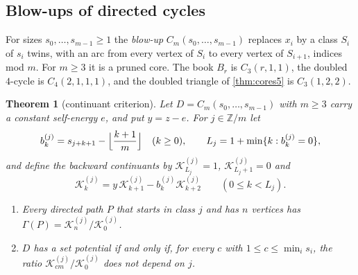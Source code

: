 \documentclass[11pt]{amsart}
\theoremstyle{plain}
\newtheorem{theorem}{Theorem}[section]
\theoremstyle{definition}
\theoremstyle{remark}
\numberwithin{equation}{section}
\newcommand{\ZZ}{\mathbb{Z}}
\newcommand{\cont}{\mathcal{K}}           %
\begin{document}
\subsection{Blow-ups of directed cycles}
For sizes $s_0,\dots,s_{m-1}\ge1$ the \emph{blow-up} $C_m(s_0,\dots,s_{m-1})$ replaces $x_i$ by a class $S_i$ of $s_i$ twins, with an arc from every vertex of $S_i$ to every vertex of $S_{i+1}$, indices mod $m$. For $m\ge3$ it is a pruned core. The book $B_r$ is $C_3(r,1,1)$, the doubled $4$-cycle is $C_4(2,1,1,1)$, and the doubled triangle of \cref{thm:cores5} is $C_3(1,2,2)$.

\begin{theorem}[continuant criterion]\label{thm:blowup-criterion}
Let $D=C_m(s_0,\dots,s_{m-1})$ with $m\ge3$ carry a constant self-energy $e$, and put $y=z-e$. For $j\in\ZZ/m$ let
\[
b^{(j)}_k=s_{j+k+1}-\Bigl\lfloor\frac{k+1}{m}\Bigr\rfloor\quad(k\ge0),\qquad L_j=1+\min\{k:b^{(j)}_k=0\},
\]
and define the \emph{backward continuants} by $\cont^{(j)}_{L_j}=1$, $\cont^{(j)}_{L_j+1}=0$ and
\[
\cont^{(j)}_k=y\,\cont^{(j)}_{k+1}-b^{(j)}_k\cont^{(j)}_{k+2}\qquad(0\le k<L_j).
\]
\begin{enumerate}[label=\textup{(\arabic*)}]
\item Every directed path $P$ that starts in class $j$ and has $n$ vertices has $\Gamma(P)=\cont^{(j)}_n/\cont^{(j)}_0$.
\item $D$ has a set potential if and only if, for every $c$ with $1\le c\le\min_is_i$, the ratio $\cont^{(j)}_{cm}/\cont^{(j)}_0$ does not depend on $j$.
\end{enumerate}
\end{theorem}
\end{document}
